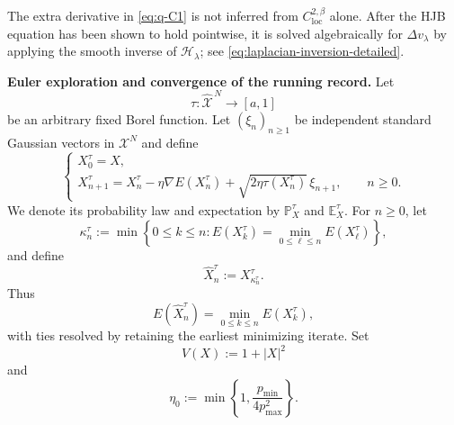 \documentclass[11pt]{article}
\def\Xc{{\mathcal X}}
\def\hX{\widehat{\Xc}^{\,N}}
\newcommand{\Record}{\widehat X}
\newcommand{\pmin}{p_{\min}}
\newcommand{\pmax}{p_{\max}}
\theoremstyle{definition}
\theoremstyle{remark}
\numberwithin{equation}{section}
\begin{document}
The extra derivative in \eqref{eq:q-C1} is not inferred from
$C^{2,\beta}_{\mathrm{loc}}$ alone.  After the HJB equation has been shown to hold pointwise, it is
solved algebraically for $\Delta v_\lambda$ by applying the smooth inverse of
$\mathscr H_\lambda$; see \eqref{eq:laplacian-inversion-detailed}.

\medskip

\noindent\textbf{Euler exploration and convergence of the running record.} Let
\begin{equation}\label{eq:generic-temperature-main-results}
 \tau:\hX\longrightarrow[a,1]
\end{equation}
be an arbitrary fixed Borel function.   Let
$(\xi_n)_{n\ge1}$ be independent standard Gaussian vectors in $\Xc^N$ and define
\begin{equation}\label{eq:euler-chain-main-results}
 \begin{cases}
 X_0^\tau=X,\\[0.4ex]
 \displaystyle
 X_{n+1}^\tau
 =X_n^\tau-\eta\nabla E(X_n^\tau)
 +\sqrt{2\eta\tau(X_n^\tau)}\,\xi_{n+1},
 \qquad n\ge0.
 \end{cases}
\end{equation}
We denote its probability law and expectation by $\mathbb P_X^\tau$ and $\mathbb E_X^\tau$.
For $n\ge0$, let
\begin{equation}\label{eq:record-index-main-results}
 \kappa_n^\tau
 :=\min\left\{
 0\le k\le n:
 E(X_k^\tau)=\min_{0\le\ell\le n}E(X_\ell^\tau)
 \right\},
\end{equation}
and define
\begin{equation}\label{eq:record-definition-main-results}
 \Record_n^\tau:=X_{\kappa_n^\tau}^\tau.
\end{equation}
Thus
\[
 E(\Record_n^\tau)=\min_{0\le k\le n}E(X_k^\tau),
\]
with ties resolved by retaining the earliest minimizing iterate.  Set
\[
 V(X):=1+|X|^2
\]
and
\begin{equation}\label{eq:eta0}
 \eta_0:=\min\left\{1,\frac{\pmin}{4\pmax^2}\right\}.
\end{equation}
\end{document}
